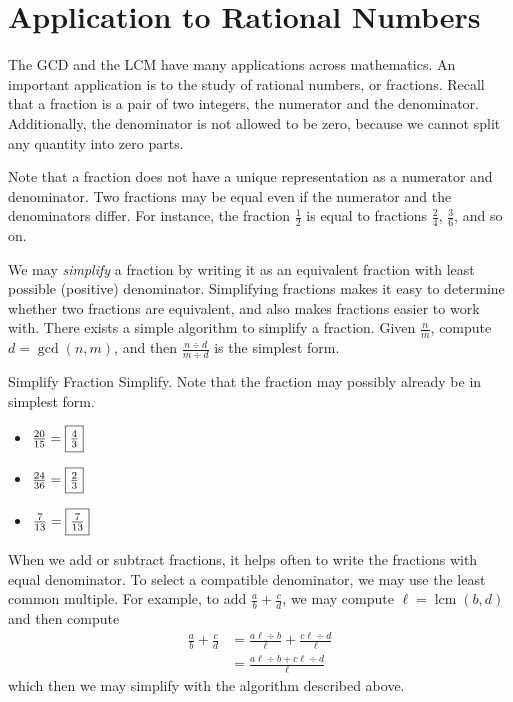 \documentclass[a4paper,10pt]{report}
\begin{document}
\section{Application to Rational Numbers}

The GCD and the LCM have many applications across mathematics. An important
application is to the study of rational numbers, or fractions. Recall that a
fraction is a pair of two integers, the numerator and the denominator.
Additionally, the denominator is not allowed to be zero, because we cannot split
any quantity into zero parts.

Note that a fraction does not have a unique representation as a numerator and
denominator. Two fractions may be equal even if the numerator and the
denominators differ. For instance, the fraction $\frac{1}{2}$ is equal to
fractions $\frac{2}{4}$, $\frac{3}{6}$, and so on.

We may \emph{simplify} a fraction by writing it as an equivalent fraction with
least possible (positive) denominator. Simplifying fractions makes it easy to
determine whether two fractions are equivalent, and also makes fractions easier
to work with. There exists a simple algorithm to simplify a fraction. Given
$\frac{n}{m}$, compute $d=\gcd(n, m)$, and then $\frac{n\div d}{m\div d}$ is the
simplest form.

\begin{problem}{Simplify Fraction}
 Simplify. Note that the fraction may possibly already be in simplest form.

 \begin{itemize}
  \item $\frac{20}{15}=\Ans{\frac{4}{3}}$
  \item $\frac{24}{36}=\Ans{\frac{2}{3}}$
  \item $\frac{7}{13}=\Ans{\frac{7}{13}}$
 \end{itemize}
\end{problem}

When we add or subtract fractions, it helps often to write the fractions with
equal denominator. To select a compatible denominator, we may use the least
common multiple. For example, to add $\frac{a}{b}+\frac{c}{d}$, we may compute
$\ell=\operatorname{lcm}(b, d)$ and then compute \begin{align*}
 \frac{a}{b}+\frac{c}{d}
 &= \frac{a\ell\div b}{\ell} + \frac{c\ell\div d}{\ell} \\
 &= \frac{a\ell\div b + c\ell\div d}{\ell}
\end{align*} which then we may simplify with the algorithm described above.
\end{document}
